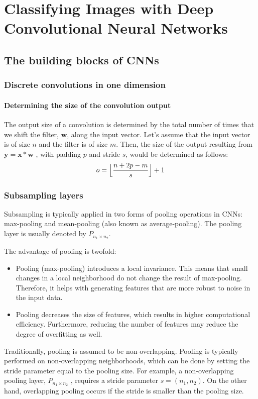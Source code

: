 \chapter{Classifying Images with Deep Convolutional Neural Networks\label{Ch14}}
\section{The building blocks of CNNs}
\subsection{Discrete convolutions in one dimension}
\subsubsection*{Determining the size of the convolution output}
The output size of a convolution is determined by the total number of times that we shift the filter, $\bm{w}$, along the input vector. Let's assume that the input vector is of size $n$ and the filter is of size $m$. Then, the size of the output resulting from $\bm{y}=\bm{x}*\bm{w}$ , with padding $p$ and stride $s$, would be determined as follows:
\begin{equation}
    o=\Bigl\lfloor\frac{n+2p-m}{s}\Bigr\rfloor+1
\end{equation}

\subsection{Subsampling layers}
Subsampling is typically applied in two forms of pooling operations in CNNs: max-pooling and
mean-pooling (also known as average-pooling). The pooling layer is usually denoted by $P_{n_1\times n_2}$.

The advantage of pooling is twofold:
\begin{itemize}
    \item Pooling (max-pooling) introduces a local invariance. This means that small changes in a local neighborhood do not change the result of max-pooling. Therefore, it helps with generating features that are more robust to noise in the input data.
    \item Pooling decreases the size of features, which results in higher computational efficiency. Furthermore, reducing the number of features may reduce the degree of overfitting as well.
\end{itemize}

\begin{tcolorbox}[title=Overlapping versus non-overlapping pooling]
    Traditionally, pooling is assumed to be non-overlapping. Pooling is typically performed on non-overlapping neighborhoods, which can be done by setting the stride parameter equal to the pooling size. For example, a non-overlapping pooling layer, $P_{n_1\times n_2}$ , requires a stride parameter $s = (n_1, n_2)$. On the other hand, overlapping pooling occurs if the stride is smaller than the pooling size.
\end{tcolorbox}